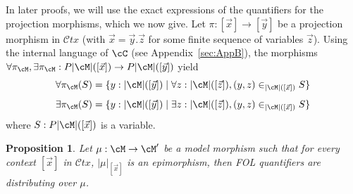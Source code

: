 \documentclass[preprint,3p,times]{elsarticle}
\newtheorem{proposition}[definition]{Proposition}
\newcommand{\Ctx}{\mathcal{C}tx}
\begin{document}
\medskip
In later proofs, we will use the exact expressions of the quantifiers for the projection morphisms, which we now give. Let $\pi : [\vec{x}] \to [\vec{y}]$ be a projection morphism in $\Ctx$ (with \(\vec{x} = \vec{y}.\vec{z}\) for some finite sequence of variables \(\vec{z}\)). Using the internal language of $\cC$ (see Appendix~\ref{sec:AppB}), the morphisms $\forall \pi_\cM, \exists \pi_\cM : P|\cM|([\vec{x}]) \to P|\cM|([\vec{y}])$ yield
\[\forall \pi_{\cM}(S) = \{y : |\cM|([\vec{y}]) \mid \forall z:|\cM|([\vec{z}]), (y,z) \in_{|\cM|([\vec{x}])} S\}\]
\[\exists \pi_{\cM}(S) = \{y : |\cM|([\vec{y}]) \mid \exists z:|\cM|([\vec{z}]), (y,z) \in_{|\cM|([\vec{x}])} S\}\]
where $S:P |\cM|([\vec{x}])$ is a variable. 

\begin{proposition}
\label{prop:distributing in FOL}
Let \(\mu: \cM \to \cM'\) be a model morphism such that for every context \([\vec{x}]\) in \(\Ctx\), \(|\mu|_{[\vec{x}]}\) is an epimorphism,\footnotemark{} then FOL quantifiers are distributing over \(\mu\).


\end{proposition}
\end{document}
